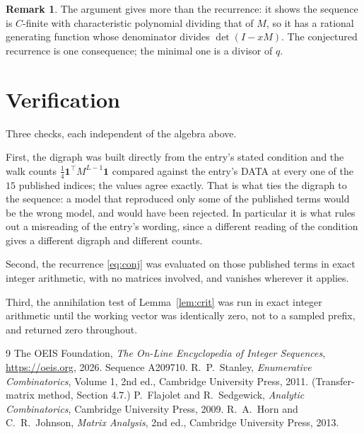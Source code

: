 \documentclass[11pt,a4paper]{article}
\theoremstyle{plain}
\theoremstyle{definition}
\newtheorem{remark}[theorem]{Remark}
\begin{document}
\begin{remark}
The argument gives more than the recurrence: it shows the sequence is $C$-finite with
characteristic polynomial dividing that of $M$, so it has a rational generating function
whose denominator divides $\det(I-xM)$. The conjectured recurrence is one consequence; the
minimal one is a divisor of $q$.
\end{remark}

\section{Verification}

Three checks, each independent of the algebra above.

First, the digraph was built directly from the entry's stated condition and the walk counts
$\tfrac1{4}\mathbf{1}^{\!\top}M^{L-1}\mathbf{1}$ compared against the entry's DATA at
every one of the $15$ published indices; the values agree exactly. That is what ties
the digraph to the sequence: a model that reproduced only some of the published terms would
be the wrong model, and would have been rejected. In particular it is what rules out a
misreading of the entry's wording, since a different reading of the condition gives a
different digraph and different counts.

Second, the recurrence \eqref{eq:conj} was evaluated on those published terms in exact
integer arithmetic, with no matrices involved, and vanishes wherever it applies.

Third, the annihilation test of Lemma~\ref{lem:crit} was run in exact integer arithmetic
until the working vector was identically zero, not to a sampled prefix, and returned zero
throughout.

\begin{thebibliography}{9}
 The OEIS Foundation, \emph{The On-Line Encyclopedia of Integer
Sequences}, \url{https://oeis.org}, 2026. Sequence A209710.
 R.~P.~Stanley, \emph{Enumerative Combinatorics}, Volume 1, 2nd ed.,
Cambridge University Press, 2011. (Transfer-matrix method, Section 4.7.)
 P.~Flajolet and R.~Sedgewick, \emph{Analytic Combinatorics}, Cambridge
University Press, 2009.
 R.~A.~Horn and C.~R.~Johnson, \emph{Matrix Analysis}, 2nd ed., Cambridge
University Press, 2013.
\end{thebibliography}
\end{document}
